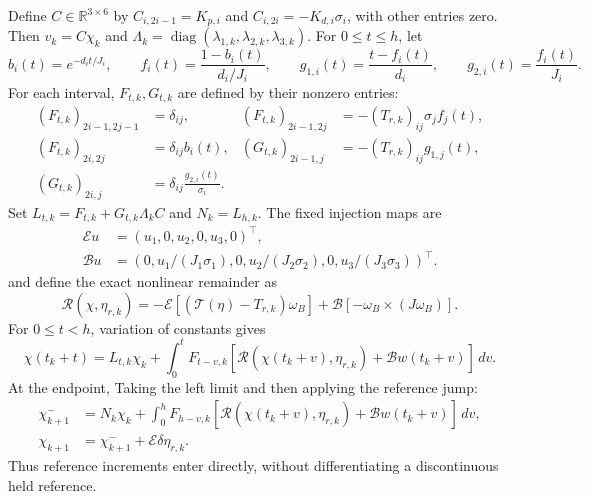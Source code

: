 \documentclass[12pt, a4paper]{article}
\begin{document}
Define $C\in\mathbb R^{3\times6}$ by
$C_{i,2i-1}=K_{p,i}$ and $C_{i,2i}=-K_{d,i}\sigma_i$, with other entries zero.
Then $v_k=C\chi_k$ and
$\Lambda_k=\operatorname{diag}(\lambda_{1,k},\lambda_{2,k},\lambda_{3,k})$.
For $0\le t\le h$, let
\begin{equation}
 b_i(t)=e^{-d_it/J_i},\qquad
 f_i(t)=\frac{1-b_i(t)}{d_i/J_i},\qquad
 g_{1,i}(t)=\frac{t-f_i(t)}{d_i},\qquad
 g_{2,i}(t)=\frac{f_i(t)}{J_i}.
 \label{uhrc:eq:scalar-flow}
\end{equation}
For each interval, $F_{t,k},G_{t,k}$ are defined by their nonzero entries:
\begin{align}
 (F_{t,k})_{2i-1,2j-1}&=\delta_{ij},&
 (F_{t,k})_{2i-1,2j}&=-(T_{r,k})_{ij}\sigma_jf_j(t),\nonumber\\
 (F_{t,k})_{2i,2j}&=\delta_{ij}b_i(t),&
 (G_{t,k})_{2i-1,j}&=-(T_{r,k})_{ij}g_{1,j}(t),\nonumber\\
 (G_{t,k})_{2i,j}&=\delta_{ij}\frac{g_{2,i}(t)}{\sigma_i}.&&
 \label{uhrc:eq:maps}
\end{align}
Set $L_{t,k}=F_{t,k}+G_{t,k}\Lambda_kC$ and $N_k=L_{h,k}$.
The fixed injection maps are
\begin{align}
 \mathcal Eu&=(u_1,0,u_2,0,u_3,0)^\top,\nonumber\\
 \mathcal Bu&=(0,u_1/(J_1\sigma_1),0,u_2/(J_2\sigma_2),
                         0,u_3/(J_3\sigma_3))^\top.
 \label{uhrc:eq:injections}
\end{align}
and define the exact nonlinear remainder as
\begin{equation}
 \mathcal R(\chi,\eta_{r,k})
 =-\mathcal E[(\mathcal T(\eta)-T_{r,k})\omega_B]
  +\mathcal B[-\omega_B\times(J\omega_B)].
 \label{uhrc:eq:remainder}
\end{equation}
For $0\le t<h$, variation of constants gives
\begin{equation}
 \chi(t_k+t)=L_{t,k}\chi_k+
 \int_0^t F_{t-v,k}
 \left[\mathcal R(\chi(t_k+v),\eta_{r,k})+
                    \mathcal Bw(t_k+v)\right]\,dv.
 \label{uhrc:eq:flow}
\end{equation}
At the endpoint, Taking the left limit and then applying the reference jump:
\begin{align}
 \chi_{k+1}^{-}
 &=N_k\chi_k+
 \int_0^h F_{h-v,k}
 \left[\mathcal R(\chi(t_k+v),\eta_{r,k})+
                    \mathcal Bw(t_k+v)\right]\,dv,\nonumber\\
 \chi_{k+1}&=\chi_{k+1}^{-}+\mathcal E\delta\eta_{r,k}.
 \label{uhrc:eq:jump}
\end{align}
Thus reference increments enter directly, without differentiating a
discontinuous held reference.
\end{document}
